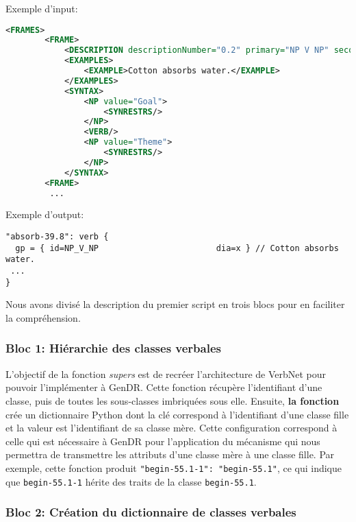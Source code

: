 Exemple d'input:
\begin{lstlisting}[language=XML, caption=Cadre syntaxique de VerbNet pour la classe absorb-39.8, label=fig:absorbxml]
<FRAMES>
        <FRAME>
            <DESCRIPTION descriptionNumber="0.2" primary="NP V NP" secondary="Basic Transitive" xtag=""/>
            <EXAMPLES>
                <EXAMPLE>Cotton absorbs water.</EXAMPLE>
            </EXAMPLES>
            <SYNTAX>
                <NP value="Goal">
                    <SYNRESTRS/>
                </NP>
                <VERB/>
                <NP value="Theme">
                    <SYNRESTRS/>
                </NP>
            </SYNTAX>
		<FRAME>
         ...
\end{lstlisting}

Exemple d'output:
\begin{lstlisting}[language=mate, caption=Membres verbaux pointant vers leur classe]
"absorb-39.8": verb {
  gp = { id=NP_V_NP                        dia=x } // Cotton absorbs water.
 ...
}
\end{lstlisting}


Nous avons divisé la description du premier script en trois blocs pour en faciliter la compréhension.

\subsubsection{Bloc 1: Hiérarchie des classes verbales}

L'objectif de la fonction \emph{supers} est de recréer l'architecture de VerbNet pour pouvoir l'implémenter à GenDR. Cette fonction récupère l'identifiant d'une classe, puis de toutes les sous-classes imbriquées sous elle. Ensuite, \textbf{la fonction} crée un dictionnaire Python dont la clé correspond à l'identifiant d'une classe fille et la valeur est l'identifiant de sa classe mère. Cette configuration correspond à celle qui est nécessaire à GenDR pour l'application du mécanisme qui nous permettra de transmettre les attributs d'une classe mère à une classe fille. Par exemple, cette fonction produit \lstinline|"begin-55.1-1": "begin-55.1"|, ce qui indique que \texttt{begin-55.1-1} hérite des traits de la classe \texttt{begin-55.1}.

\subsubsection{Bloc 2: Création du dictionnaire de classes verbales}

